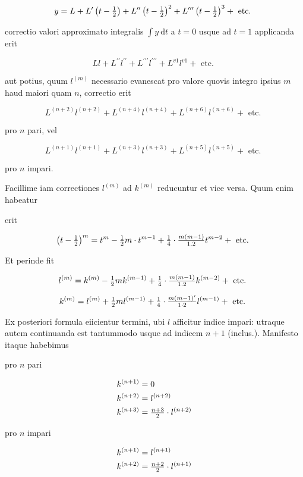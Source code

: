 \documentclass[twoside,12pt, showframe]{memoir}
\let\oldfrac\frac
\def\frac#1#2{\mathchoice{\tfrac{#1}{#2}}{\oldfrac{#1}{#2}}{\genfrac{}{}{}{2}{#1}{#2\mathstrut}}{\genfrac{}{}{}{3}{#1}{#2\mathstrut}}}
\begin{document}
\[
y=L+L^{\prime}\left(t-\frac{1}{2}\right)+L^{\prime \prime}\left(t-\frac{1}{2}\right)^{2}+L^{\prime \prime \prime}\left(t-\frac{1}{2}\right)^{3}+\text { etc. }
\]

correctio valori approximato integralis \(\int y \mathrm{~d} t\) a \(t=0\) usque ad \(t=1\) applicanda erit

\[
L l+L^{\prime \prime} l^{\prime \prime}+L^{\prime \prime \prime} l^{\prime \prime \prime}+L^{v 1} l^{v 1}+\text { etc. }
\]

aut potius, quum \(l^{(m)}\) necessario evanescat pro valore quovis integro ipsius \(m\) haud maiori quam \(n\), correctio erit

\[
L^{(n+2)} l^{(n+2)}+L^{(n+4)} l^{(n+4)}+L^{(n+6)} l^{(n+6)}+\text { etc. }
\]

pro \(n\) pari, vel

\[
L^{(n+1)} l^{(n+1)}+L^{(n+3)} l^{(n+3)}+L^{(n+5)} l^{(n+5)}+\text { etc. }
\]

pro \(n\) impari.

Facillime iam correctiones \(l^{(m)}\) ad \(k^{(m)}\) reducuntur et vice versa. Quum enim habeatur

erit

\[
\left(t-\frac{1}{2}\right)^{m}=t^{m}-\frac{1}{2} m \cdot t^{m-1}+\frac{1}{4} \cdot \frac{m(m-1)}{1.2} t^{m-2}+\text { etc. }
\]

Et perinde fit

\[
l^{(m)}=k^{(m)}-\frac{1}{2} m k^{(m-1)}+\frac{1}{4} \cdot \frac{m(m-1)}{1.2} k^{(m-2)}+\text { etc. }
\]

\[
k^{(m)}=l^{(m)}+\frac{1}{2} m l^{(m-1)}+\frac{1}{4} \cdot \frac{m(m-1)^{\prime}}{1 \cdot 2} l^{(m-1)}+\text { etc. }
\]

Ex posteriori formula eiicientur termini, ubi \(l\) afficitur indice impari: utraque autem continuanda est tantummodo usque ad indicem \(n+1\) (inclus.). Manifesto itaque habebimus

pro \(n\) pari

\[
\begin{aligned}
& k^{(n+1)}=0 \\
& k^{(n+2)}=l^{(n+2)} \\
& k^{(n+3)}=\frac{n+3}{2} \cdot l^{(n+2)}
\end{aligned}
\]

pro \(n\) impari

\[
\begin{aligned}
& k^{(n+1)}=l^{(n+1)} \\
& k^{(n+2)}=\frac{n+2}{2} \cdot l^{(n+1)}
\end{aligned}
\]
\end{document}
